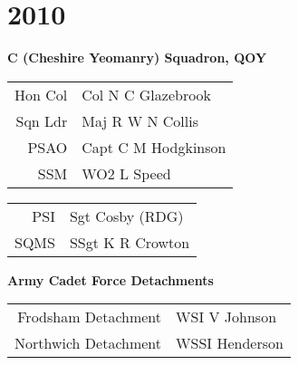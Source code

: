 \chapter*{2010}

\vspace*{20mm}

\begin{center}
  \Large
  \textbf{C (Cheshire Yeomanry) Squadron, QOY}
\end{center}

\begin{center}
  \begin{tabular}{rl}
    Hon Col & Col N C Glazebrook \\
    Sqn Ldr & Maj R W N Collis \\
    PSAO & Capt C M Hodgkinson \\
    SSM & WO2 L Speed \\
  \end{tabular}
\end{center}

\begin{center}
  \begin{tabular}{rl}
    PSI & Sgt Cosby (RDG) \\
    SQMS & SSgt K R Crowton \\
  \end{tabular}
\end{center}

\vspace*{20mm}

\begin{center}
  \Large
  \textbf{Army Cadet Force Detachments}
\end{center}

\begin{center}
  \begin{tabular}{rl}
    Frodsham Detachment & WSI V Johnson \\
    Northwich Detachment & WSSI Henderson \\
  \end{tabular}
\end{center}
